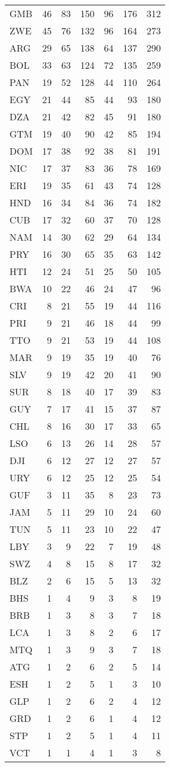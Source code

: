 \documentclass[
]{article}
\begin{document}
\begin{longtable}[]{@{}lrrrrrr@{}}
GMB & 46 & 83 & 150 & 96 & 176 & 312\tabularnewline
ZWE & 45 & 76 & 132 & 96 & 164 & 273\tabularnewline
ARG & 29 & 65 & 138 & 64 & 137 & 290\tabularnewline
BOL & 33 & 63 & 124 & 72 & 135 & 259\tabularnewline
PAN & 19 & 52 & 128 & 44 & 110 & 264\tabularnewline
EGY & 21 & 44 & 85 & 44 & 93 & 180\tabularnewline
DZA & 21 & 42 & 82 & 45 & 91 & 180\tabularnewline
GTM & 19 & 40 & 90 & 42 & 85 & 194\tabularnewline
DOM & 17 & 38 & 92 & 38 & 81 & 191\tabularnewline
NIC & 17 & 37 & 83 & 36 & 78 & 169\tabularnewline
ERI & 19 & 35 & 61 & 43 & 74 & 128\tabularnewline
HND & 16 & 34 & 84 & 36 & 74 & 182\tabularnewline
CUB & 17 & 32 & 60 & 37 & 70 & 128\tabularnewline
NAM & 14 & 30 & 62 & 29 & 64 & 134\tabularnewline
PRY & 16 & 30 & 65 & 35 & 63 & 142\tabularnewline
HTI & 12 & 24 & 51 & 25 & 50 & 105\tabularnewline
BWA & 10 & 22 & 46 & 24 & 47 & 96\tabularnewline
CRI & 8 & 21 & 55 & 19 & 44 & 116\tabularnewline
PRI & 9 & 21 & 46 & 18 & 44 & 99\tabularnewline
TTO & 9 & 21 & 53 & 19 & 44 & 108\tabularnewline
MAR & 9 & 19 & 35 & 19 & 40 & 76\tabularnewline
SLV & 9 & 19 & 42 & 20 & 41 & 90\tabularnewline
SUR & 8 & 18 & 40 & 17 & 39 & 83\tabularnewline
GUY & 7 & 17 & 41 & 15 & 37 & 87\tabularnewline
CHL & 8 & 16 & 30 & 17 & 33 & 65\tabularnewline
LSO & 6 & 13 & 26 & 14 & 28 & 57\tabularnewline
DJI & 6 & 12 & 27 & 12 & 27 & 57\tabularnewline
URY & 6 & 12 & 25 & 12 & 25 & 54\tabularnewline
GUF & 3 & 11 & 35 & 8 & 23 & 73\tabularnewline
JAM & 5 & 11 & 29 & 10 & 24 & 60\tabularnewline
TUN & 5 & 11 & 23 & 10 & 22 & 47\tabularnewline
LBY & 3 & 9 & 22 & 7 & 19 & 48\tabularnewline
SWZ & 4 & 8 & 15 & 8 & 17 & 32\tabularnewline
BLZ & 2 & 6 & 15 & 5 & 13 & 32\tabularnewline
BHS & 1 & 4 & 9 & 3 & 8 & 19\tabularnewline
BRB & 1 & 3 & 8 & 3 & 7 & 18\tabularnewline
LCA & 1 & 3 & 8 & 2 & 6 & 17\tabularnewline
MTQ & 1 & 3 & 9 & 3 & 7 & 18\tabularnewline
ATG & 1 & 2 & 6 & 2 & 5 & 14\tabularnewline
ESH & 1 & 2 & 5 & 1 & 3 & 10\tabularnewline
GLP & 1 & 2 & 6 & 2 & 4 & 12\tabularnewline
GRD & 1 & 2 & 6 & 1 & 4 & 12\tabularnewline
STP & 1 & 2 & 5 & 1 & 4 & 11\tabularnewline
VCT & 1 & 1 & 4 & 1 & 3 & 8\tabularnewline
\bottomrule
\end{longtable}
\end{document}
